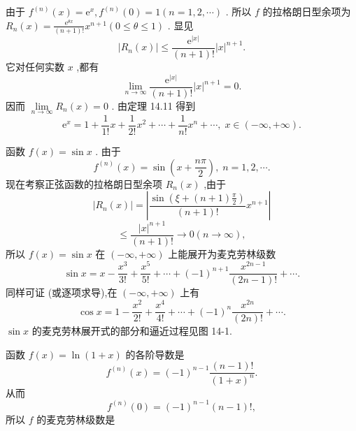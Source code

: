 \begin{solution}

\end{solution}
由于 \({f}^{\left( n\right) }\left( x\right)  = {\mathrm{e}}^{x},{f}^{\left( n\right) }\left( 0\right)  = 1\left( {n = 1,2,\cdots }\right)\) . 所以 \(f\) 的拉格朗日型余项为 \({R}_{n}\left( x\right)  = \frac{{\mathrm{e}}^{\theta x}}{\left( {n + 1}\right) !}{x}^{n + 1}\left( {0 \leq  \theta  \leq  1}\right)\) . 显见
\[
\left| {{R}_{n}\left( x\right) }\right|  \leq  \frac{{\mathrm{e}}^{\left| x\right| }}{\left( {n + 1}\right) !}{\left| x\right| }^{n + 1}.
\]
它对任何实数 \(x\) ,都有
\[
\mathop{\lim }\limits_{{n \rightarrow  \infty }}\frac{{\mathrm{e}}^{\left| x\right| }}{\left( {n + 1}\right) !}{\left| x\right| }^{n + 1} = 0.
\]
因而 \(\mathop{\lim }\limits_{{n \rightarrow  \infty }}{R}_{n}\left( x\right)  = 0\) . 由定理 14.11 得到
\[
{\mathrm{e}}^{x} = 1 + \frac{1}{1!}x + \frac{1}{2!}{x}^{2} + \cdots  + \frac{1}{n!}{x}^{n} + \cdots ,\;x \in  \left( {-\infty , + \infty }\right) .
\]
\begin{example}

\end{example}
函数 \(f\left( x\right)  = \sin x\) . 由于
\[
{f}^{\left( n\right) }\left( x\right)  = \sin \left( {x + \frac{n\pi }{2}}\right) ,\;n = 1,2,\cdots .
\]
现在考察正弦函数的拉格朗日型余项 \({R}_{n}\left( x\right)\) ,由于
\[
\left| {{R}_{n}\left( x\right) }\right|  = \left| {\frac{\sin \left( {\xi  + \left( {n + 1}\right) \frac{\pi }{2}}\right) }{\left( {n + 1}\right) !}{x}^{n + 1}}\right|
\]
\[
\leq  \frac{{\left| x\right| }^{n + 1}}{\left( {n + 1}\right) !} \rightarrow  0\left( {n \rightarrow  \infty }\right) ,
\]
所以 \(f\left( x\right)  = \sin x\) 在 \(\left( {-\infty , + \infty }\right)\) 上能展开为麦克劳林级数
\[
\sin x = x - \frac{{x}^{3}}{3!} + \frac{{x}^{5}}{5!} + \cdots  + {\left( -1\right) }^{n + 1}\frac{{x}^{{2n} - 1}}{\left( {{2n} - 1}\right) !} + \cdots .
\]
同样可证 (或逐项求导),在 \(\left( {-\infty , + \infty }\right)\) 上有
\[
\cos x = 1 - \frac{{x}^{2}}{2!} + \frac{{x}^{4}}{4!} + \cdots  + {\left( -1\right) }^{n}\frac{{x}^{2n}}{\left( {2n}\right) !} + \cdots .
\]
\(\sin x\) 的麦克劳林展开式的部分和逼近过程见图 14-1.

\begin{example}

\end{example}
函数 \(f\left( x\right)  = \ln \left( {1 + x}\right)\) 的各阶导数是
\[
{f}^{\left( n\right) }\left( x\right)  = {\left( -1\right) }^{n - 1}\frac{\left( {n - 1}\right) !}{{\left( 1 + x\right) }^{n}}.
\]
从而
\[
{f}^{\left( n\right) }\left( 0\right)  = {\left( -1\right) }^{n - 1}\left( {n - 1}\right) !,
\]
所以 \(f\) 的麦克劳林级数是

